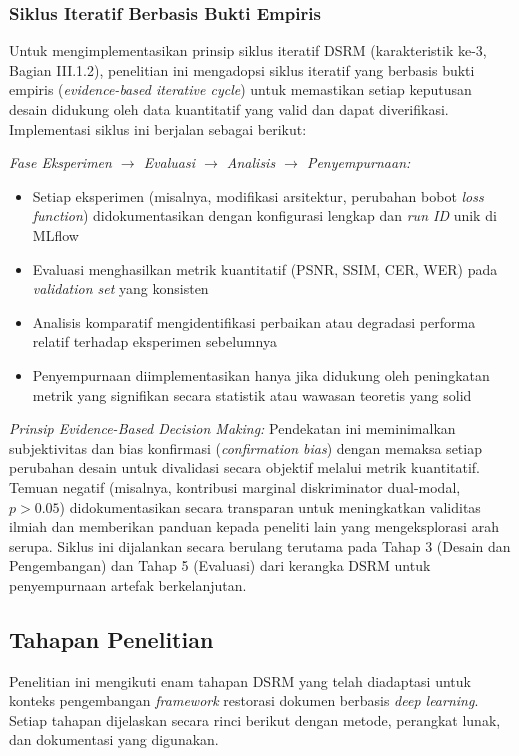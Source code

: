 \documentclass[12pt,a4paper]{book}
\begin{document}
\subsubsection{Siklus Iteratif Berbasis Bukti Empiris}
Untuk mengimplementasikan prinsip siklus iteratif DSRM (karakteristik ke-3, Bagian III.1.2), penelitian ini mengadopsi siklus iteratif yang berbasis bukti empiris (\textit{evidence-based iterative cycle}) untuk memastikan setiap keputusan desain didukung oleh data kuantitatif yang valid dan dapat diverifikasi. Implementasi siklus ini berjalan sebagai berikut:

\textit{Fase Eksperimen $\rightarrow$ Evaluasi $\rightarrow$ Analisis $\rightarrow$ Penyempurnaan:}
\begin{itemize}[nosep]
    \item Setiap eksperimen (misalnya, modifikasi arsitektur, perubahan bobot \textit{loss function}) didokumentasikan dengan konfigurasi lengkap dan \textit{run ID} unik di MLflow
    \item Evaluasi menghasilkan metrik kuantitatif (PSNR, SSIM, CER, WER) pada \textit{validation set} yang konsisten
    \item Analisis komparatif mengidentifikasi perbaikan atau degradasi performa relatif terhadap eksperimen sebelumnya
    \item Penyempurnaan diimplementasikan hanya jika didukung oleh peningkatan metrik yang signifikan secara statistik atau wawasan teoretis yang solid
\end{itemize}

\textit{Prinsip \textit{Evidence-Based Decision Making:}} Pendekatan ini meminimalkan subjektivitas dan bias konfirmasi (\textit{confirmation bias}) dengan memaksa setiap perubahan desain untuk divalidasi secara objektif melalui metrik kuantitatif. Temuan negatif (misalnya, kontribusi marginal diskriminator dual-modal, $p>0.05$) didokumentasikan secara transparan untuk meningkatkan validitas ilmiah dan memberikan panduan kepada peneliti lain yang mengeksplorasi arah serupa. Siklus ini dijalankan secara berulang terutama pada Tahap 3 (Desain dan Pengembangan) dan Tahap 5 (Evaluasi) dari kerangka DSRM untuk penyempurnaan artefak berkelanjutan.

\subsection{Tahapan Penelitian}
\label{subsec:tahapan-penelitian}

Penelitian ini mengikuti enam tahapan DSRM yang telah diadaptasi untuk konteks pengembangan \textit{framework} restorasi dokumen berbasis \textit{deep learning}. Setiap tahapan dijelaskan secara rinci berikut dengan metode, perangkat lunak, dan dokumentasi yang digunakan.
\end{document}
